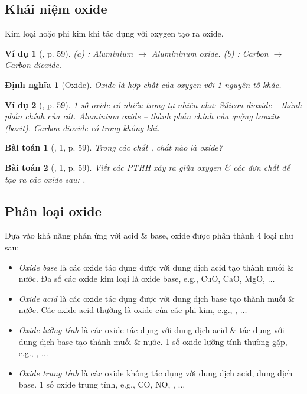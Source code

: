 \documentclass{article}
\newtheorem{baitoan}{Bài toán}
\newtheorem{dinhnghia}{Định nghĩa}
\newtheorem{vidu}{Ví dụ}
\begin{document}
\subsection{Khái niệm oxide}
Kim loại hoặc phi kim khi tác dụng với oxygen tạo ra oxide.

\begin{vidu}[\cite{SGK_KHTN_8_Canh_Dieu}, p. 59]
	(a) \emph{}: Aluminium $\to$ Alumininum oxide. (b) \emph{}: Carbon $\to$ Carbon dioxide.
\end{vidu}

\begin{dinhnghia}[Oxide]
	\emph{Oxide} là hợp chất của oxygen với 1 nguyên tố khác.
\end{dinhnghia}

\begin{vidu}[\cite{SGK_KHTN_8_Canh_Dieu}, p. 59]
	1 số oxide có nhiều trong tự nhiên như: Silicon dioxide \emph{} -- thành phần chính của cát. Aluminium oxide \emph{} -- thành phần chính của quặng bauxite (boxit). Carbon dioxide \emph{} có trong không khí.
\end{vidu}

\begin{baitoan}[\cite{SGK_KHTN_8_Canh_Dieu}, 1, p. 59]
	Trong các chất \emph{}, chất nào là oxide?
\end{baitoan}

\begin{baitoan}[\cite{SGK_KHTN_8_Canh_Dieu}, 1, p. 59]
	Viết các PTHH xảy ra giữa oxygen \& các đơn chất để tạo ra các oxide sau: \emph{}.
\end{baitoan}

\subsection{Phân loại oxide}
Dựa vào khả năng phản ứng với acid \& base, oxide được phân thành 4 loại như sau:
\begin{itemize}
	\item \textit{Oxide base} là các oxide tác dụng được với dung dịch acid tạo thành muối \& nước. Đa số các oxide kim loại là oxide base, e.g., CuO, CaO, MgO, $\ldots$
	\item \textit{Oxide acid} là các oxide tác dụng được với dung dịch base tạo thành muối \& nước. Các oxide acid thường là oxide của các phi kim, e.g., , $\ldots$
	\item \textit{Oxide lưỡng tính} là các oxide tác dụng với dung dịch acid \& tác dụng với dung dịch base tạo thành muối \& nước. 1 số oxide lưỡng tính thường gặp, e.g., , $\ldots$
	\item \textit{Oxide trung tính} là các oxide không tác dụng với dung dịch acid, dung dịch base. 1 số oxide trung tính, e.g., CO, NO, , $\ldots$
\end{itemize}
\end{document}
